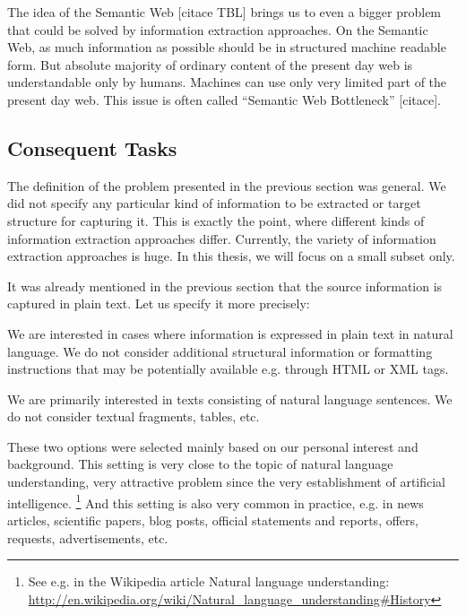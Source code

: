 The idea of the Semantic Web [citace TBL] brings us to even a bigger problem that could be solved by information extraction approaches. On the Semantic Web, as much information as possible should be in structured machine readable form. But absolute majority of ordinary content of the present day web is understandable only by humans. Machines can use only very limited part of the present day web. This issue is often called “Semantic Web Bottleneck” [citace].

\subsection{Consequent Tasks}

The definition of the problem presented in the previous section was general. We did not specify any particular kind of information to be extracted or target structure for capturing it. This is exactly the point, where different kinds of information extraction approaches differ. Currently, the variety of information extraction approaches is huge. In this thesis, we will focus on a small subset only. 

It was already mentioned in the previous section that the source information is captured in plain text. Let us specify it more precisely: 

We are interested in cases where information is expressed in plain text in natural language. We do not consider additional structural information or formatting instructions that may be potentially available e.g. through HTML or XML tags. 

We are primarily interested in texts consisting of natural language sentences. We do not consider textual fragments, tables, etc.

These two options were selected mainly based on our personal interest and background. This setting is very close to the topic of natural language understanding, very attractive problem since the very establishment of artificial intelligence. 
\footnote{See e.g. in the Wikipedia article Natural language understanding: \url{http://en.wikipedia.org/wiki/Natural_language_understanding#History}}
And this setting is also very common in practice, e.g. in news articles, scientific papers, blog posts, official statements and reports, offers, requests, advertisements, etc. 



